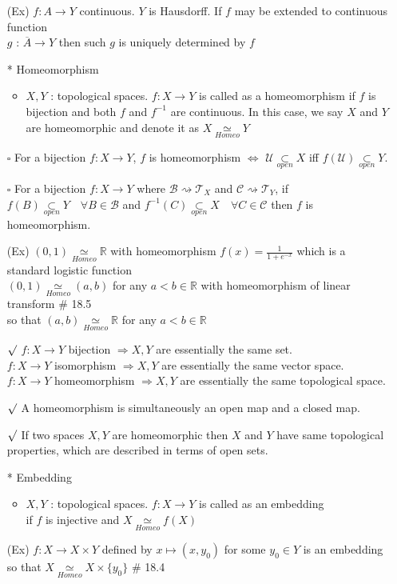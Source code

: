 \documentclass[12pt]{article}
\newcommand{\sq}{$\square$}
\newcommand{\rmk}{$\surd$}
\newcommand{\sptwo}{\hspace{0.2cm}}
\newcommand{\Real}{\mathbb{R}}
\newcommand{\open}{\underset{open}{\subset}}
\newcommand{\cl}{\overline}
\newcommand{\homeo}{\underset{Homeo}{\simeq}}
\begin{document}
\begin{itemize}
	\item[(Ex)] $f : A\rightarrow Y$ continuous. $Y$ is Hausdorff. If $f$ may be extended to continuous function\\ $g$ : $\cl{A}\rightarrow Y$ then such $g$ is uniquely determined by $f$
	\item[*] Homeomorphism
	\begin{itemize}
		\item $X,Y$ : topological spaces. $f : X\rightarrow Y$ is called as a homeomorphism if $f$ is bijection and both $f$ and $f^{-1}$ are continuous. In this case, we say $X$ and $Y$ are homeomorphic and denote it as $X\homeo Y$
	\end{itemize}
	\item[\sq] For a bijection $f : X\rightarrow Y$, $f$ is homeomorphism $\Leftrightarrow$ $\mathcal{U} \open X$ iff $f(\mathcal{U})\open Y$.
	\item[\sq] For a bijection $f : X\rightarrow Y$ where $\mathcal{B} \rightsquigarrow \mathcal{T}_X$ and $\mathcal{C} \rightsquigarrow \mathcal{T}_Y$, if $f(B)\open Y \quad \forall B\in \mathcal{B}$ and $f^{-1}(C)\open X \quad \forall C\in \mathcal{C}$ then $f$ is homeomorphism.
	\item[(Ex)] $(0,1) \homeo \Real$ with homeomorphism $f(x)= \frac{1}{1+e^{-x}}$ which is a standard logistic function
	\\ $(0,1) \homeo (a,b)$ for any $a<b\in \Real$ with homeomorphism of linear transform \sptwo \# 18.5 \\ so that $(a,b) \homeo \Real$ for any $a<b\in \Real$
	\item[$\surd$] $f : X\rightarrow Y$ bijection $\Rightarrow X, Y$ are essentially the same set. 
	\\ $f : X\rightarrow Y$ isomorphism $\Rightarrow X, Y$ are essentially the same vector space.
	\\ $f : X\rightarrow Y$ homeomorphism $\Rightarrow X, Y$ are essentially the same topological space.
	\item[\rmk] A homeomorphism is simultaneously an open map and a closed map.
	\item[$\surd$] If two spaces $X, Y$ are homeomorphic then $X$ and $Y$ have same topological properties, which are described in terms of open sets.
	\item[*] Embedding
	\begin{itemize}
		\item $X, Y$ : topological spaces. $f : X\rightarrow Y$ is called as an embedding\\ if $f$ is injective and $X\homeo f(X)$
	\end{itemize} 
	\item[(Ex)] $f : X\rightarrow X\times Y$ defined by $x \mapsto (x, y_0)$ for some $y_0\in Y$ is an embedding so that $X\homeo X\times \{y_0\}$ \quad \# 18.4
\end{itemize}
\end{document}
